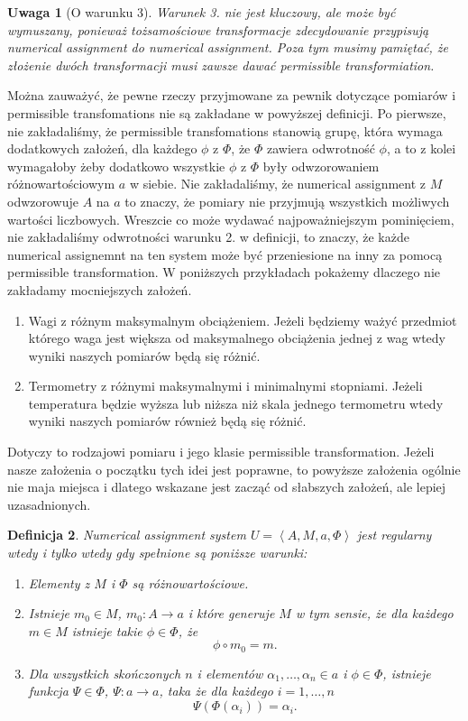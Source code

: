 \documentclass[12pt,a4paper]{report}
\newtheorem{definition}{Definicja}[chapter]
\newtheorem{remark}[definition]{Uwaga}
\newcommand{\tuple}[1]{\left\langle {#1} \right\rangle}
\begin{document}
\begin{remark}[O warunku 3]
Warunek 3. nie jest kluczowy, ale może być wymuszany, ponieważ tożsamościowe transformacje zdecydowanie przypisują numerical assignment do numerical assignment. Poza tym musimy pamiętać, że złożenie dwóch transformacji musi zawsze dawać permissible transformiation.
\end{remark}

  Można zauważyć, że pewne rzeczy przyjmowane za pewnik dotyczące pomiarów i permissible transfomations  nie są zakładane w powyższej definicji. Po pierwsze, nie zakładaliśmy, że permissible transfomations stanowią grupę, która wymaga dodatkowych założeń, dla każdego $\phi$ z $\Phi$, że $\Phi$ zawiera odwrotność $\phi$, a to z kolei wymagałoby żeby dodatkowo wszystkie $\phi$ z $\Phi$ były odwzorowaniem różnowartościowym $a$ w siebie. Nie zakładaliśmy, że numerical assignment z $M$ odwzorowuje $A$ na $a$ to znaczy, że pomiary nie przyjmują wszystkich  możliwych wartości liczbowych. Wreszcie co może wydawać najpoważniejszym pominięciem, nie zakładaliśmy odwrotności warunku 2. w definicji, to znaczy, że każde numerical assignemnt na ten system może być przeniesione na inny za pomocą permissible transformation. W poniższych przykładach pokażemy dlaczego nie zakładamy mocniejszych założeń.
\begin{enumerate}
\item
Wagi z różnym maksymalnym obciążeniem. Jeżeli będziemy ważyć przedmiot którego waga jest większa od maksymalnego obciążenia jednej z wag wtedy wyniki naszych pomiarów będą się różnić. 
\item
Termometry z różnymi maksymalnymi i minimalnymi stopniami. Jeżeli temperatura będzie wyższa lub niższa niż skala jednego termometru wtedy wyniki naszych pomiarów również będą się różnić.
\end{enumerate}  
   Dotyczy to rodzajowi pomiaru i jego klasie permissible transformation. Jeżeli nasze założenia o początku tych idei jest poprawne, to powyższe założenia ogólnie nie maja miejsca i dlatego wskazane jest zacząć od słabszych założeń, ale lepiej uzasadnionych.  
\begin{definition}
Numerical assignment system $U=\tuple{A, M, a, \Phi}$ jest regularny wtedy i tylko wtedy gdy spełnione są poniższe warunki:
\begin{enumerate}
\item
Elementy z $M$ i $\Phi$ są różnowartościowe.
\item
Istnieje $m_{0}\in M$, $m_0:A\to a$ i które generuje $M$ w tym sensie, że dla każdego $m\in M$ istnieje takie $\phi\in \Phi$, że
$$
\phi \circ m_{0}=m.
$$
\item
Dla wszystkich skończonych $n$ i elementów $\alpha_{1},\dots,\alpha_{n}\in a$ i  $\phi\in \Phi$, istnieje funkcja $\Psi\in \Phi$, $\Psi:a\to a$, taka że dla każdego $i=1,\ldots,n$ 
$$
\Psi(\Phi(\alpha_{i}))=\alpha_{i}.
$$
\end{enumerate}
\end{definition}
\end{document}
